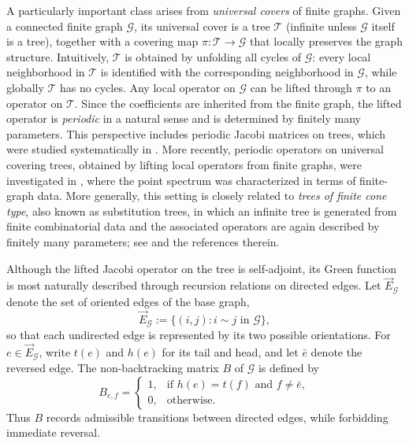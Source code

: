 \documentclass[11pt,twoside, a4paper]{article}
\numberwithin{equation}{section}
\numberwithin{figure}{section}
\theoremstyle{plain} %
\theoremstyle{definition}
\theoremstyle{remark}
\newcommand{\1} {\mspace{1 mu}}
\newcommand{\2} {\mspace{2 mu}}
\begin{document}
A particularly important class arises from \emph{universal covers} of
finite graphs. Given a connected finite graph \(\mathcal G\), its universal
cover is a tree \(\mathcal T\) (infinite unless \(\mathcal G\) itself is a tree), together with a covering map
\(\pi:\mathcal T\to\mathcal G\) that locally preserves the graph structure.
Intuitively, \(\mathcal T\) is obtained by unfolding all cycles of
\(\mathcal G\): every local neighborhood in \(\mathcal T\) is identified
with the corresponding neighborhood in \(\mathcal G\), while globally
\(\mathcal T\) has no cycles. Any local operator on \(\mathcal G\) can be
lifted through \(\pi\) to an operator on \(\mathcal T\). Since the
coefficients are inherited from the finite graph, the lifted operator is
\emph{periodic} in a natural sense and is determined by finitely many parameters.
This perspective includes periodic Jacobi matrices on trees, which were
studied systematically in \cite{AvniBreuerSimon2020}. More recently,
periodic operators on universal covering trees, obtained by lifting local
operators from finite graphs, were investigated in
\cite{BanksGarzaVargasMukherjee2022}, where the point spectrum was
characterized in terms of finite-graph data. More generally, this setting
is closely related to \emph{trees of finite cone type}, also known as
substitution trees, in which an infinite tree is generated from finite
combinatorial data and the associated operators are again described by
finitely many parameters; see
\cite{KellerLenzWarzel2013,KellerLenzWarzel2014,random2002nagnibeda,Sadel2013} and the
references therein.

Although the lifted Jacobi operator on the tree is self-adjoint, its Green
function is most naturally described through recursion relations on
directed edges. Let \(\vec E_{\mathcal G}\) denote the set of oriented
edges of the base graph,
\[
    \vec E_{\mathcal G}
    :=
    \{(i,j): i\sim j \text{ in } \mathcal G\},
\]
so that each undirected edge is represented by its two possible
orientations. For \(e\in \vec E_{\mathcal G}\), write \(t(e)\) and
\(h(e)\) for its tail and head, and let \(\bar e\) denote the reversed
edge. The non-backtracking matrix \( B\) of \(\mathcal G\) is
defined by
\[
   B_{e,f}
    =
    \begin{cases}
    1, & \text{if } h(e)=t(f) \text{ and } f\neq \bar e,\\
    0, & \text{otherwise}.
    \end{cases}
\]
Thus \( B\) records admissible transitions between directed edges,
while forbidding immediate reversal.
\end{document}
